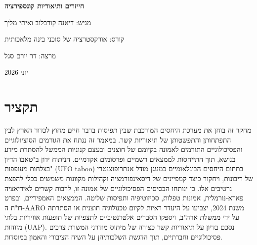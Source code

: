 \documentclass[12pt,a4paper]{article}
\begin{document}
\begin{titlepage}
\centering
\vspace*{3cm}
{\Huge\bfseries חייזרים ותיאוריות קונספירציה\par}
\vspace{2cm}
{\Large מגיש: דיאנה קורבלוב ואיתי מליך\par}
\vspace{1cm}
{\large קורס: אורקסטרציה של סוכני בינה מלאכותית\par}
{\large מרצה: דר יורם סגל\par}
\vfill
{\large יוני 2026\par}
\end{titlepage}
\newpage
\section*{תקציר}
מחקר זה בוחן את מערכת היחסים המורכבת שבין תפיסות בדבר חיים מחוץ לכדור הארץ לבין התפתחותן והתפשטותן של תיאוריות קשר. במאמר זה ננתח את הגורמים הסוציולוגיים והפסיכולוגיים התורמים לאמונה בקיומם של חוצנים ובעצם קנוניות הממשל להסתרת מידע בנושא, תוך התייחסות לממצאים רשמיים ופרסומים אקדמיים. הניתוח ידון ב"טאבו הדיון בצלחות מעופפות" (UFO taboo) בתחום היחסים הבינלאומיים כמעגן מודל אנתרופוצנטרי של ריבונות, ויחקור כיצד קמפיינים של דיסאינפורמציה וקהילות מקוונות משמשים ככלי להפצת נרטיבים אלו. כן ינותחו הבסיסים הפסיכולוגיים של אמונה זו, לרבות קשרים לאידיאציה פארא-נורמלית, אמונות טפלות, סכיזוטיפיה ותפיסות שליטה. הממצאים האמפיריים, ובפרט דו"ח ה-AARO משנת 2024, יצביעו על היעדר ראיות לקיום טכנולוגיה חוצנית או הסתרתה על ידי ממשלת ארה"ב, ויספקו הסברים אלטרנטיביים לתצפיות של תופעות אוויריות בלתי מזוהות (UAP). נסכם בדיון על תיאוריות קשר כצורה של מיתוס מודרני המשרת צרכים פסיכולוגיים וחברתיים, תוך הדגשת השלכותיהן על השיח הציבורי והאמון במוסדות.
\end{document}
